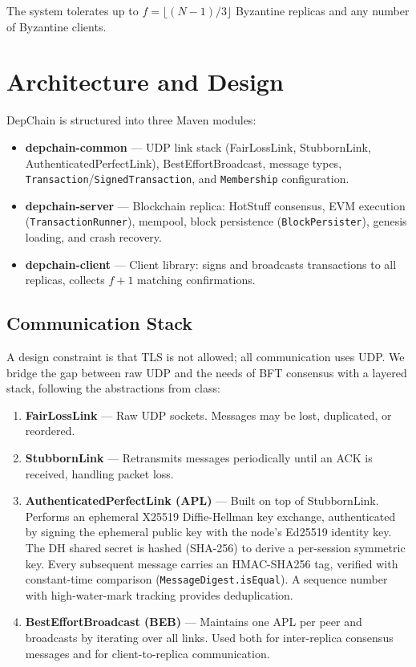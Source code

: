 \documentclass{llncs}
\begin{document}
The system tolerates up to $f = \lfloor(N{-}1)/3\rfloor$ Byzantine replicas and any number of Byzantine clients.

\section{Architecture and Design}

DepChain is structured into three Maven modules:
\begin{itemize}
    \item \textbf{depchain-common} --- UDP link stack (FairLossLink, StubbornLink, AuthenticatedPerfectLink), BestEffortBroadcast, message types, \texttt{Transaction}/\texttt{SignedTransaction}, and \texttt{Membership} configuration.
    \item \textbf{depchain-server} --- Blockchain replica: HotStuff consensus, EVM execution (\texttt{TransactionRunner}), mempool, block persistence (\texttt{BlockPersister}), genesis loading, and crash recovery.
    \item \textbf{depchain-client} --- Client library: signs and broadcasts transactions to all replicas, collects $f{+}1$ matching confirmations.
\end{itemize}

\subsection{Communication Stack}

A design constraint is that TLS is not allowed; all communication uses UDP. We bridge the gap between raw UDP and the needs of BFT consensus with a layered stack, following the abstractions from class:

\begin{enumerate}
    \item \textbf{FairLossLink} --- Raw UDP sockets. Messages may be lost, duplicated, or reordered.
    \item \textbf{StubbornLink} --- Retransmits messages periodically until an ACK is received, handling packet loss.
    \item \textbf{AuthenticatedPerfectLink (APL)} --- Built on top of StubbornLink. Performs an ephemeral X25519 Diffie-Hellman key exchange, authenticated by signing the ephemeral public key with the node's Ed25519 identity key. The DH shared secret is hashed (SHA-256) to derive a per-session symmetric key. Every subsequent message carries an HMAC-SHA256 tag, verified with constant-time comparison (\texttt{MessageDigest.isEqual}). A sequence number with high-water-mark tracking provides deduplication.
    \item \textbf{BestEffortBroadcast (BEB)} --- Maintains one APL per peer and broadcasts by iterating over all links. Used both for inter-replica consensus messages and for client-to-replica communication.
\end{enumerate}
\end{document}
